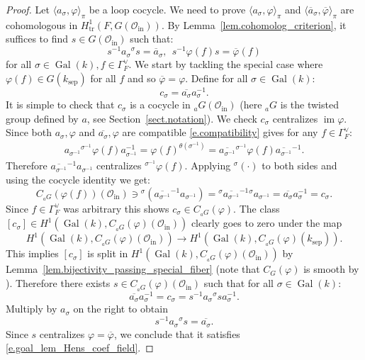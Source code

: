 \documentclass[12pt]{amsart}
\numberwithin{equation}{section}
\theoremstyle{definition}
\newcommand{\cO}{\mathcal{O}}
\newcommand{\im}{\operatorname{im}}
\newcommand{\Gal}{\operatorname{Gal}}
\newcommand{\sep}{\operatorname{sep}}
\newcommand{\tr}{\operatorname{tr}}
\newcommand{\ksep}{k_{\sep}}
\newcommand{\oin}{\operatorname{in}}
\newcommand{\Oin}{\cO_{\oin}}
\newcommand{\vphi}{\varphi}
\newcommand{\I}[1]{\Gamma_{#1}^{\vee}}
\begin{document}
\begin{proof}
    Let $\langle a_\sigma,\vphi\rangle_\pi$ be a loop cocycle. We need to prove  $\langle a_\sigma,\vphi\rangle_\pi$ and  $\langle \overline{a}_\sigma,\overline{\vphi}\rangle_\pi$ are cohomologous in $H^1_{\tr}(F,G(\Oin))$. By Lemma~\ref{lem.cohomolog_criterion}, it suffices to find $s\in G(\Oin)$ such that:
    \begin{equation}\label{e.goal_lem_Hens_coef_field}
    s^{-1}  a_\sigma {}^{\sigma} s= \overline{a}_\sigma, \ \ s^{-1} \vphi(f) s = \overline{\vphi}(f)
    \end{equation}
     for all $\sigma\in \Gal(k), f\in \I{F}$.
    We start by tackling the special case where $\vphi(f)\in G(\ksep)$ for all $f$ and so $\overline{\vphi} = \vphi$. Define for all $\sigma\in \Gal(k)$: $$c_\sigma = \overline{a_\sigma} a_\sigma^{-1}.$$ It is simple to check that $c_\sigma$ is a cocycle in ${}_a G(\Oin)$ (here ${}_a G$ is the twisted group defined by $a$, see Section~\ref{sect.notation}). We check $c_\sigma$ centralizes $\im\vphi$. Since both $a_\sigma,\vphi$ and $\overline{a_\sigma},\vphi$ are compatible  \eqref{e.compatibility} gives for any $f\in \I{F}$:
    \begin{align*}
        a_{\sigma^{-1}} {}^{\sigma^{-1}}\vphi(f) a_{\sigma^{-1}}^{-1} =   \vphi(f)^{\theta(\sigma^{-1})} = \overline{a_{\sigma^{-1}}} {}^{\sigma^{-1}} \vphi(f) \overline{a_{\sigma^{-1}}}^{-1}.
    \end{align*}
    Therefore $\overline{a_{\sigma^{-1}}}^{-1} a_{\sigma^{-1}}$ centralizes ${}^{\sigma^{-1}} \vphi(f)$. Applying ${}^{\sigma}(\cdot)$ to both sides and using the cocycle identity we get:
    $$C_{{}_a G}(\vphi(f))(\Oin) \ni {}^{\sigma}(\overline{a_{\sigma^{-1}}}^{-1} a_{\sigma^{-1}}) = {}^{\sigma}\overline{a_{\sigma^{-1}}}^{-1}  {}^{\sigma}a_{\sigma^{-1}} = \overline{a_\sigma} a_\sigma^{-1} = c_\sigma.$$
    Since $f \in \I{F}$ was arbitrary this shows $c_\sigma\in C_{{}_a G}(\vphi)$.
    The class $[c_\sigma] \in H^1(\Gal(k),C_{{}_a G}(\vphi)(\Oin))$ clearly goes to zero under the map  $$H^1(\Gal(k),C_{{}_a G}(\vphi)(\Oin))\to H^1(\Gal(k),C_{{}_a G}(\vphi)(\ksep)).$$ 
    This implies $[c_\sigma]$ is split in $H^1(\Gal(k),C_{{}_a G}(\vphi)(\Oin))$ by Lemma~\ref{lem.bijectivity_passing_special_fiber} (note that $C_G(\vphi)$ is smooth by \cite[Expose XI, Corollaire 5.3]{SGA3}). Therefore there exists $s\in C_{{}_a G}(\vphi)(\Oin)$ such that for all $\sigma\in \Gal(k)$:
    $$\overline{a_\sigma} a_\sigma^{-1} =c_\sigma = s^{-1} a_\sigma {}^{\sigma} s a_\sigma^{-1}.$$
    Multiply by $a_\sigma$ on the right to obtain $$ s^{-1} a_\sigma {}^{\sigma} s =\overline{a_\sigma} .$$
    Since $s$ centralizes $\vphi = \overline{\vphi}$, we conclude that it satisfies \eqref{e.goal_lem_Hens_coef_field}.


\end{proof}
\end{document}
